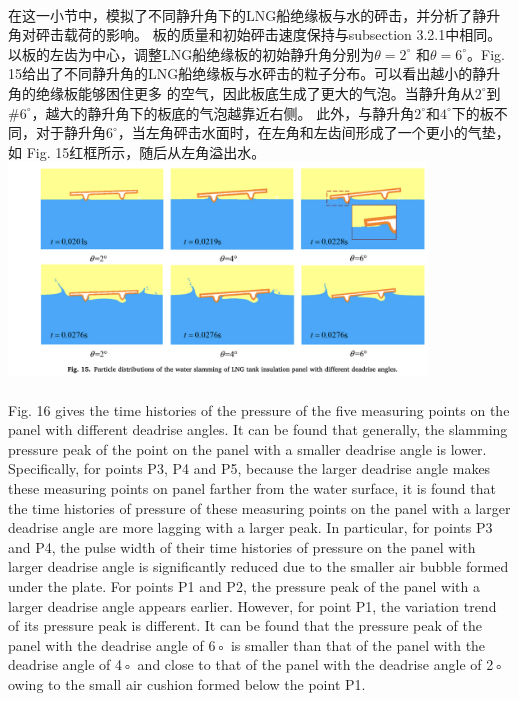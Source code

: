 \documentclass[UTF8]{ctexart}
\begin{document}
\paragraph{\quad}在这一小节中，模拟了不同静升角下的LNG船绝缘板与水的砰击，并分析了静升角对砰击载荷的影响。
                板的质量和初始砰击速度保持与subsection 3.2.1中相同。以板的左齿为中心，调整LNG船绝缘板的初始静升角分别为$\theta = 2^\circ$
                和$\theta = 6^\circ$。Fig. 15给出了不同静升角的LNG船绝缘板与水砰击的粒子分布。可以看出越小的静升角的绝缘板能够困住更多
                的空气，因此板底生成了更大的气泡。当静升角从$2^\circ$到#$6^\circ$，越大的静升角下的板底的气泡越靠近右侧。
                此外，与静升角$2^\circ$和$4^\circ$下的板不同，对于静升角$6^\circ$，当左角砰击水面时，在左角和左齿间形成了一个更小的气垫，如
                Fig. 15红框所示，随后从左角溢出水。\\
{
    \centering
    \includegraphics[width=30em]{./source/Fig15.png}
}

\paragraph{\quad}Fig. 16 gives the time histories of the pressure of the five measuring points on the panel 
                with different deadrise angles. It can be found that generally, the slamming pressure peak 
                of the point on the panel with a smaller deadrise angle is lower. Specifically, for points 
                P3, P4 and P5, because the larger deadrise angle makes these measuring points on panel farther 
                from the water surface, it is found that the time histories of pressure of these measuring 
                points on the panel with a larger deadrise angle are more lagging with a larger peak. 
                In particular, for points P3 and P4, the pulse width of their time histories of pressure on 
                the panel with larger deadrise angle is significantly reduced due to the smaller air bubble 
                formed under the plate. For points P1 and P2, the pressure peak of the panel with a larger 
                deadrise angle appears earlier. However, for point P1, the variation trend of its pressure 
                peak is different. It can be found that the pressure peak of the panel with the deadrise angle 
                of 6◦ is smaller than that of the panel with the deadrise angle of 4◦ and close to that of the 
                panel with the deadrise angle of 2◦ owing to the small air cushion formed below the point P1.
\end{document}
